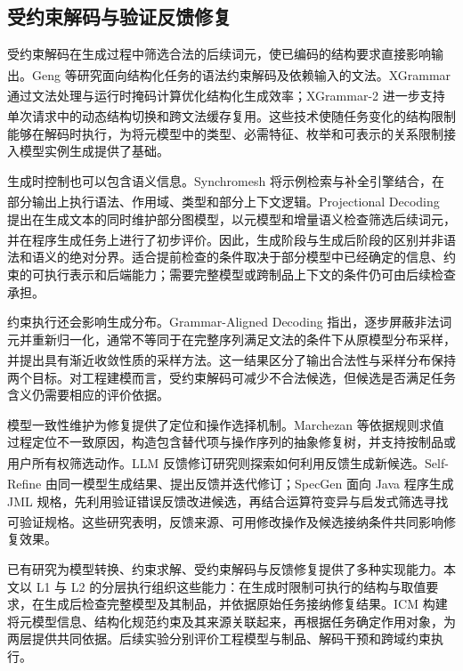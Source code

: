 \documentclass[pdflatex,iicol,sn-mathphys-num]{sn-jnl}
\newcommand{\paperref}[1]{\textsuperscript{\textcolor{citationred}{\citep{#1}}}}
\begin{document}
\subsection{受约束解码与验证反馈修复}\label{sec:related-2-4}

受约束解码在生成过程中筛选合法的后续词元，使已编码的结构要求直接影响输出。Geng 等研究面向结构化任务的语法约束解码及依赖输入的文法\paperref{geng-etal-2023-grammar}。XGrammar 通过文法处理与运行时掩码计算优化结构化生成效率\paperref{MLSYS2025_5c20ca4b}；XGrammar-2 进一步支持单次请求中的动态结构切换和跨文法缓存复用\paperref{Li_2026}。这些技术使随任务变化的结构限制能够在解码时执行，为将元模型中的类型、必需特征、枚举和可表示的关系限制接入模型实例生成提供了基础。


生成时控制也可以包含语义信息。Synchromesh 将示例检索与补全引擎结合，在部分输出上执行语法、作用域、类型和部分上下文逻辑\paperref{poesia2022synchromesh}。Projectional Decoding 提出在生成文本的同时维护部分图模型，以元模型和增量语义检查筛选后续词元，并在程序生成任务上进行了初步评价\paperref{Chen_2026}。因此，生成阶段与生成后阶段的区别并非语法和语义的绝对分界。适合提前检查的条件取决于部分模型中已经确定的信息、约束的可执行表示和后端能力；需要完整模型或跨制品上下文的条件仍可由后续检查承担。


约束执行还会影响生成分布。Grammar-Aligned Decoding 指出，逐步屏蔽非法词元并重新归一化，通常不等同于在完整序列满足文法的条件下从原模型分布采样，并提出具有渐近收敛性质的采样方法\paperref{NEURIPS2024_2bdc2267}。这一结果区分了输出合法性与采样分布保持两个目标。对工程建模而言，受约束解码可减少不合法候选，但候选是否满足任务含义仍需要相应的评价依据。


模型一致性维护为修复提供了定位和操作选择机制。Marchezan 等依据规则求值过程定位不一致原因，构造包含替代项与操作序列的抽象修复树，并支持按制品或用户所有权筛选动作\paperref{Marchezan2023}。LLM 反馈修订研究则探索如何利用反馈生成新候选。Self-Refine 由同一模型生成结果、提出反馈并迭代修订\paperref{NEURIPS2023_91edff07}；SpecGen 面向 Java 程序生成 JML 规格，先利用验证错误反馈改进候选，再结合运算符变异与启发式筛选寻找可验证规格\paperref{Ma_2025b}。这些研究表明，反馈来源、可用修改操作及候选接纳条件共同影响修复效果。


已有研究为模型转换、约束求解、受约束解码与反馈修复提供了多种实现能力。本文以 L1 与 L2 的分层执行组织这些能力：在生成时限制可执行的结构与取值要求，在生成后检查完整模型及其制品，并依据原始任务接纳修复结果。ICM 构建将元模型信息、结构化规范约束及其来源关联起来，再根据任务确定作用对象，为两层提供共同依据。后续实验分别评价工程模型与制品、解码干预和跨域约束执行。
\end{document}
